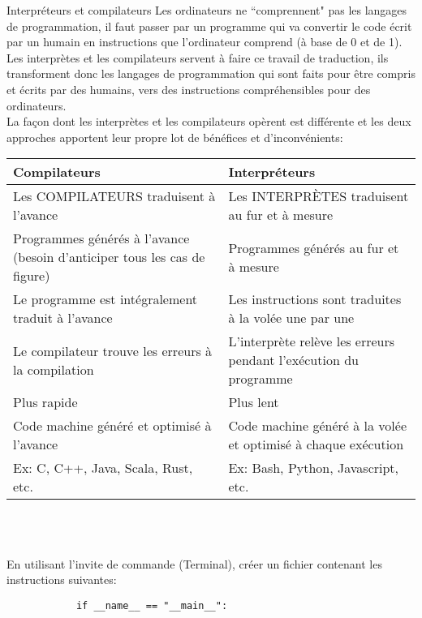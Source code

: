 \begin{section}{Interpréteurs et compilateurs}
    Les ordinateurs ne ``comprennent" pas les langages de programmation, il faut passer par un programme qui va convertir le code écrit par un humain en instructions que l'ordinateur comprend (à base de 0 et de 1).
\\
Les interprètes et les compilateurs servent à faire ce travail de traduction, ils transforment donc les langages de programmation qui sont faits pour être compris et écrits par des humains, vers des instructions compréhensibles pour des ordinateurs.
\\
La façon dont les interprètes et les compilateurs opèrent est différente et les deux approches apportent leur propre lot de bénéfices et d'inconvénients:\\
    \begin{tabular}{| C{0.45\textwidth} | C{0.45\textwidth} |} 
        \hline
        \textbf{Compilateurs} & \textbf{Interpréteurs}\\ [0.5ex]
        \hline
        Les COMPILATEURS traduisent à l'avance & Les INTERPRÈTES traduisent au fur et à mesure\\ [0.5ex] 
        \hline
        Programmes générés à l'avance (besoin d'anticiper tous les cas de figure) & Programmes générés au fur et à mesure  \\ 
        \hline
        Le programme est intégralement traduit à l'avance & Les instructions sont traduites à la volée une par une  \\
        \hline
        Le compilateur trouve les erreurs à la compilation & L'interprète relève les erreurs pendant l'exécution du programme  \\
        \hline
        Plus rapide & Plus lent \\
        \hline
        Code machine généré et optimisé à l'avance & Code machine généré à la volée et optimisé à chaque exécution  \\
        \hline
        Ex: C, C++, Java, Scala, Rust, etc. & Ex: Bash, Python, Javascript, etc. \\
        \hline
    \end{tabular}
    \\\\
    \begin{Exercice}[10 minutes]
        En utilisant l'invite de commande (Terminal), créer un fichier contenant les instructions suivantes:
        \begin{lstlisting}
            if __name__ == "__main__":

\end{lstlisting}
\end{Exercice}
\end{section}
